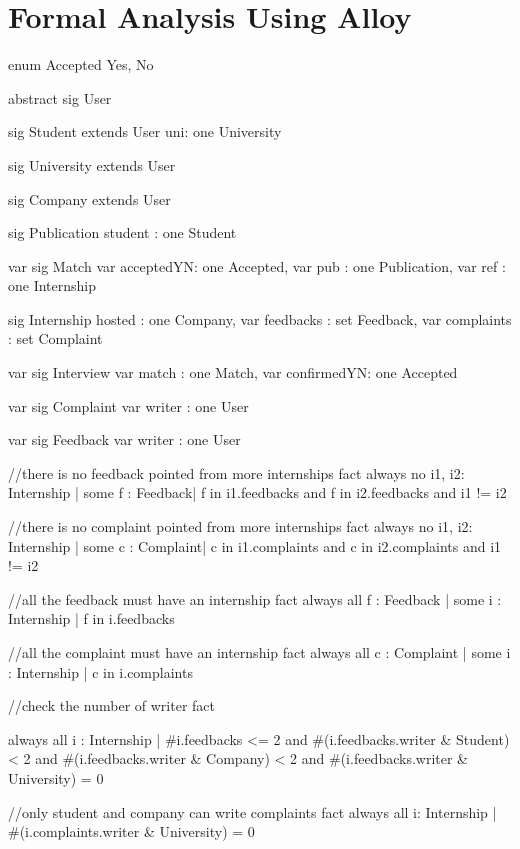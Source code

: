 \documentclass{article}
\begin{document}
\section{Formal Analysis Using Alloy}
\begin{spverbatim}
enum Accepted {Yes, No}

abstract sig User{
}


sig Student extends User{
    uni: one University
}

sig University extends User{
}

sig Company extends User{
    
}

sig Publication{
    student : one Student
}

var sig Match {
    var acceptedYN: one Accepted,
    var pub : one Publication,
    var ref : one Internship
}

sig Internship {
    hosted : one Company,
    var feedbacks : set Feedback,
    var complaints : set Complaint
}

var sig Interview {
    var match : one Match,
    var confirmedYN: one Accepted
}

var sig Complaint {
    var writer : one User
}

var sig Feedback {
    var writer : one User
}


//there is no feedback pointed from more internships
fact {
    always no i1, i2: Internship | some f : Feedback|
        f in i1.feedbacks and f in i2.feedbacks and i1 != i2
}

//there is no complaint pointed from more internships
fact {
    always no i1, i2: Internship | some c : Complaint|
        c in i1.complaints and c in i2.complaints and i1 != i2
}

//all the feedback must have an internship 
fact {
    always all f : Feedback | some i : Internship |
        f in i.feedbacks     
}

//all the complaint must have an internship 
fact {
    always all c : Complaint | some i : Internship |
        c in i.complaints     
}


//check the number of writer
fact{
    always all i : Internship | 
        #i.feedbacks <= 2 and #(i.feedbacks.writer & Student) < 2 and #(i.feedbacks.writer & Company) < 2 and 
        #(i.feedbacks.writer & University) = 0
    
}

//only student and company can write complaints 
fact {
    always all i: Internship |
        #(i.complaints.writer & University) = 0
}


\end{spverbatim}
\end{document}
